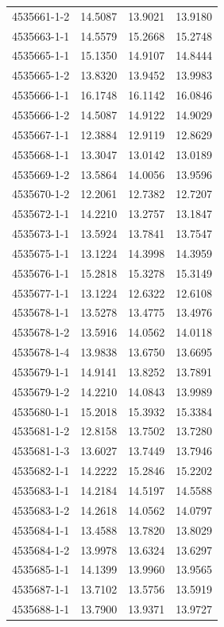 \begin{longtable}{lrrr}
4535661-1-2 & 14.5087 & 13.9021 & 13.9180 \\
4535663-1-1 & 14.5579 & 15.2668 & 15.2748 \\
4535665-1-1 & 15.1350 & 14.9107 & 14.8444 \\
4535665-1-2 & 13.8320 & 13.9452 & 13.9983 \\
4535666-1-1 & 16.1748 & 16.1142 & 16.0846 \\
4535666-1-2 & 14.5087 & 14.9122 & 14.9029 \\
4535667-1-1 & 12.3884 & 12.9119 & 12.8629 \\
4535668-1-1 & 13.3047 & 13.0142 & 13.0189 \\
4535669-1-2 & 13.5864 & 14.0056 & 13.9596 \\
4535670-1-2 & 12.2061 & 12.7382 & 12.7207 \\
4535672-1-1 & 14.2210 & 13.2757 & 13.1847 \\
4535673-1-1 & 13.5924 & 13.7841 & 13.7547 \\
4535675-1-1 & 13.1224 & 14.3998 & 14.3959 \\
4535676-1-1 & 15.2818 & 15.3278 & 15.3149 \\
4535677-1-1 & 13.1224 & 12.6322 & 12.6108 \\
4535678-1-1 & 13.5278 & 13.4775 & 13.4976 \\
4535678-1-2 & 13.5916 & 14.0562 & 14.0118 \\
4535678-1-4 & 13.9838 & 13.6750 & 13.6695 \\
4535679-1-1 & 14.9141 & 13.8252 & 13.7891 \\
4535679-1-2 & 14.2210 & 14.0843 & 13.9989 \\
4535680-1-1 & 15.2018 & 15.3932 & 15.3384 \\
4535681-1-2 & 12.8158 & 13.7502 & 13.7280 \\
4535681-1-3 & 13.6027 & 13.7449 & 13.7946 \\
4535682-1-1 & 14.2222 & 15.2846 & 15.2202 \\
4535683-1-1 & 14.2184 & 14.5197 & 14.5588 \\
4535683-1-2 & 14.2618 & 14.0562 & 14.0797 \\
4535684-1-1 & 13.4588 & 13.7820 & 13.8029 \\
4535684-1-2 & 13.9978 & 13.6324 & 13.6297 \\
4535685-1-1 & 14.1399 & 13.9960 & 13.9565 \\
4535687-1-1 & 13.7102 & 13.5756 & 13.5919 \\
4535688-1-1 & 13.7900 & 13.9371 & 13.9727 \\

\end{longtable}
